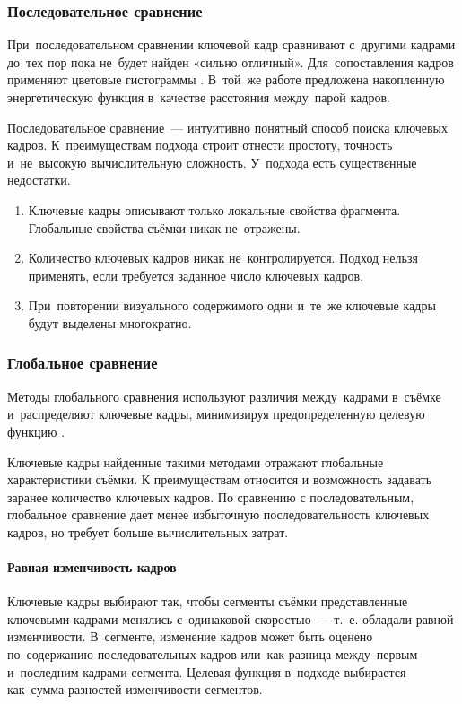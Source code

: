 \subsubsection{Последовательное сравнение}

При~последовательном сравнении ключевой кадр сравнивают
с~другими кадрами до~тех пор пока не~будет найден «сильно отличный».
Для~сопоставления кадров применяют цветовые гистограммы \cite{Zhang:2003}.
В~той~же работе предложена накопленную энергетическую функция в~качестве
расстояния между~парой кадров.

Последовательное сравнение~— интуитивно понятный способ
поиска ключевых кадров.
К~преимуществам подхода строит отнести простоту, точность
и~не~высокую вычислительную сложность.
У~подхода есть существенные недостатки.
\begin{enumerate}
    \item Ключевые кадры описывают только локальные свойства фрагмента.
            Глобальные свойства съёмки никак не~отражены.
    \item Количество ключевых кадров никак не~контролируется.
            Подход нельзя применять, если требуется заданное число
            ключевых кадров.
    \item При~повторении визуального содержимого одни и~те~же
            ключевые кадры будут выделены многократно.
\end{enumerate}

\subsubsection{Глобальное сравнение}

Методы глобального сравнения используют различия между~кадрами
в~съёмке и~распределяют ключевые кадры,
минимизируя предопределенную целевую функцию \cite{Truong:2007}.

Ключевые кадры найденные такими методами отражают глобальные
характеристики съёмки. К преимуществам относится и возможность
задавать заранее количество ключевых кадров.
По сравнению с последовательным, глобальное сравнение
дает менее избыточную последовательность ключевых кадров,
но требует больше вычислительных затрат.


\paragraph{Равная изменчивость кадров}

Ключевые кадры выбирают так,
чтобы сегменты съёмки представленные ключевыми кадрами
менялись с~одинаковой скоростью~— т.~е. обладали равной изменчивости.
В~сегменте, изменение кадров может быть оценено
по~содержанию последовательных кадров \cite{Zhang:2003}
или~как разница между~первым и~последним кадрами сегмента.
Целевая функция в~подходе выбирается как~сумма
разностей изменчивости сегментов.

